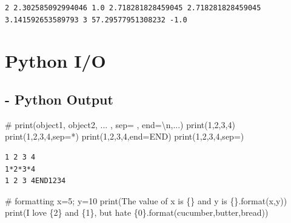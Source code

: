 \documentclass[
  letterpaper,
  DIV=11,
  numbers=noendperiod]{scrreprt}
\newenvironment{Shaded}{\begin{snugshade}}{\end{snugshade}}
\newcommand{\BuiltInTok}[1]{\textcolor[rgb]{0.00,0.23,0.31}{#1}}
\newcommand{\CommentTok}[1]{\textcolor[rgb]{0.37,0.37,0.37}{#1}}
\newcommand{\DecValTok}[1]{\textcolor[rgb]{0.68,0.00,0.00}{#1}}
\newcommand{\NormalTok}[1]{\textcolor[rgb]{0.00,0.23,0.31}{#1}}
\newcommand{\OperatorTok}[1]{\textcolor[rgb]{0.37,0.37,0.37}{#1}}
\newcommand{\SpecialCharTok}[1]{\textcolor[rgb]{0.37,0.37,0.37}{#1}}
\newcommand{\StringTok}[1]{\textcolor[rgb]{0.13,0.47,0.30}{#1}}
\begin{document}
\begin{verbatim}
2 2.302585092994046 1.0 2.718281828459045 2.718281828459045 3.141592653589793 3 57.29577951308232 -1.0
\end{verbatim}

\section{Python I/O}\label{python-io}

\subsection{- Python Output}\label{python-output}

\begin{Shaded}
\begin{Highlighting}[]
\CommentTok{\# print(object1, object2, ... , sep=\textquotesingle{} \textquotesingle{}, end=\textquotesingle{}\textbackslash{}n\textquotesingle{},...)}
\BuiltInTok{print}\NormalTok{(}\DecValTok{1}\NormalTok{,}\DecValTok{2}\NormalTok{,}\DecValTok{3}\NormalTok{,}\DecValTok{4}\NormalTok{)}
\BuiltInTok{print}\NormalTok{(}\DecValTok{1}\NormalTok{,}\DecValTok{2}\NormalTok{,}\DecValTok{3}\NormalTok{,}\DecValTok{4}\NormalTok{,sep}\OperatorTok{=}\StringTok{\textquotesingle{}*\textquotesingle{}}\NormalTok{)}
\BuiltInTok{print}\NormalTok{(}\DecValTok{1}\NormalTok{,}\DecValTok{2}\NormalTok{,}\DecValTok{3}\NormalTok{,}\DecValTok{4}\NormalTok{,end}\OperatorTok{=}\StringTok{\textquotesingle{}END\textquotesingle{}}\NormalTok{)}
\BuiltInTok{print}\NormalTok{(}\DecValTok{1}\NormalTok{,}\DecValTok{2}\NormalTok{,}\DecValTok{3}\NormalTok{,}\DecValTok{4}\NormalTok{,sep}\OperatorTok{=}\StringTok{\textquotesingle{}\textquotesingle{}}\NormalTok{)}
\end{Highlighting}
\end{Shaded}

\begin{verbatim}
1 2 3 4
1*2*3*4
1 2 3 4END1234
\end{verbatim}

\begin{Shaded}
\begin{Highlighting}[]
\CommentTok{\# formatting}
\NormalTok{x}\OperatorTok{=}\DecValTok{5}\OperatorTok{;}\NormalTok{ y}\OperatorTok{=}\DecValTok{10}
\BuiltInTok{print}\NormalTok{(}\StringTok{\textquotesingle{}The value of x is }\SpecialCharTok{\{\}}\StringTok{ and y is }\SpecialCharTok{\{\}}\StringTok{\textquotesingle{}}\NormalTok{.}\BuiltInTok{format}\NormalTok{(x,y))}
\BuiltInTok{print}\NormalTok{(}\StringTok{\textquotesingle{}I love }\SpecialCharTok{\{2\}}\StringTok{ and }\SpecialCharTok{\{1\}}\StringTok{, but hate }\SpecialCharTok{\{0\}}\StringTok{\textquotesingle{}}\NormalTok{.}\BuiltInTok{format}\NormalTok{(}\StringTok{\textquotesingle{}cucumber\textquotesingle{}}\NormalTok{,}\StringTok{\textquotesingle{}butter\textquotesingle{}}\NormalTok{,}\StringTok{\textquotesingle{}bread\textquotesingle{}}\NormalTok{))}
\end{Highlighting}
\end{Shaded}
\end{document}

